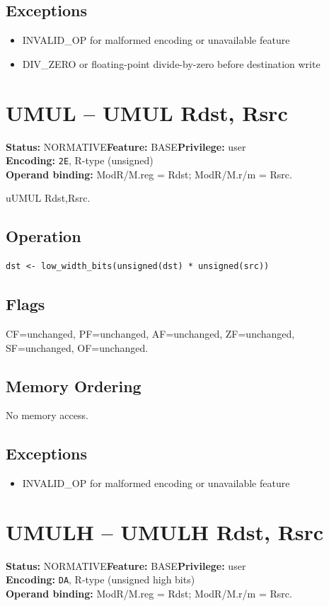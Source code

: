 \documentclass[10pt]{article}
\begin{document}
\subsection*{Exceptions}
\begin{itemize}
\item INVALID\_OP for malformed encoding or unavailable feature
\item DIV\_ZERO or floating-point divide-by-zero before destination write
\end{itemize}
\clearpage

\section{UMUL -- UMUL Rdst, Rsrc}
\textbf{Status:} NORMATIVE\quad \textbf{Feature:} BASE\quad \textbf{Privilege:} user\\
\textbf{Encoding:} \texttt{2E}, R-type (unsigned)\\
\textbf{Operand binding:} ModR/M.reg = Rdst; ModR/M.r/m = Rsrc.

uUMUL Rdst,Rsrc.

\subsection*{Operation}
\begin{lstlisting}
dst <- low_width_bits(unsigned(dst) * unsigned(src))
\end{lstlisting}
\subsection*{Flags}
CF=unchanged, PF=unchanged, AF=unchanged, ZF=unchanged, SF=unchanged, OF=unchanged.
\subsection*{Memory Ordering}
No memory access.
\subsection*{Exceptions}
\begin{itemize}
\item INVALID\_OP for malformed encoding or unavailable feature
\end{itemize}
\clearpage

\section{UMULH -- UMULH Rdst, Rsrc}
\textbf{Status:} NORMATIVE\quad \textbf{Feature:} BASE\quad \textbf{Privilege:} user\\
\textbf{Encoding:} \texttt{DA}, R-type (unsigned high bits)\\
\textbf{Operand binding:} ModR/M.reg = Rdst; ModR/M.r/m = Rsrc.
\end{document}
